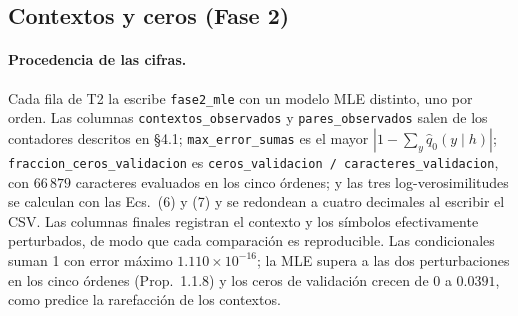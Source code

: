 \documentclass[11pt,letterpaper]{article}
\begin{document}
	\subsection{Contextos y ceros (Fase 2)}
\begin{table}[htbp]
	\centering
	\caption{Conteos, ceros en validación y log-verosimilitud de la MLE.}
	\label{tab:T2}
\end{table} 
	\paragraph{Procedencia de las cifras.}
	Cada fila de T2 la escribe \texttt{fase2\_mle} con un modelo MLE distinto, uno por orden. Las columnas \texttt{contextos\_observados} y \texttt{pares\_observados} salen de los contadores descritos en \S 4.1; \texttt{max\_error\_sumas} es el mayor $|1 - \sum_y \hat q_0(y \mid h)|$; \texttt{fraccion\_ceros\_validacion} es \texttt{ceros\_validacion / caracteres\_validacion}, con $66\,879$ caracteres evaluados en los cinco órdenes; y las tres log-verosimilitudes se calculan con las Ecs.~(6) y (7) y se redondean a cuatro decimales al escribir el CSV. Las columnas finales registran el contexto y los símbolos efectivamente perturbados, de modo que cada comparación es reproducible. Las condicionales suman 1 con error máximo $1.110 \times 10^{-16}$; la MLE supera a las dos perturbaciones en los cinco órdenes (Prop.~1.1.8) y los ceros de validación crecen de $0$ a $0.0391$, como predice la rarefacción de los contextos.
	
\end{document}
